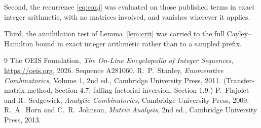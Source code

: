 \documentclass[11pt,a4paper]{article}
\theoremstyle{plain}
\theoremstyle{definition}
\begin{document}
Second, the recurrence \eqref{eq:conj} was evaluated on those published terms in exact
integer arithmetic, with no matrices involved, and vanishes wherever it applies.

Third, the annihilation test of Lemma~\ref{lem:crit} was carried to the full
Cayley--Hamilton bound in exact integer arithmetic rather than to a sampled prefix.

\begin{thebibliography}{9}
 The OEIS Foundation, \emph{The On-Line Encyclopedia of Integer
Sequences}, \url{https://oeis.org}, 2026. Sequence A281060.
 R.~P.~Stanley, \emph{Enumerative Combinatorics}, Volume 1, 2nd ed.,
Cambridge University Press, 2011. (Transfer-matrix method, Section 4.7; falling-factorial
inversion, Section 1.9.)
 P.~Flajolet and R.~Sedgewick, \emph{Analytic Combinatorics}, Cambridge
University Press, 2009.
 R.~A.~Horn and C.~R.~Johnson, \emph{Matrix Analysis}, 2nd ed., Cambridge
University Press, 2013.
\end{thebibliography}
\end{document}
